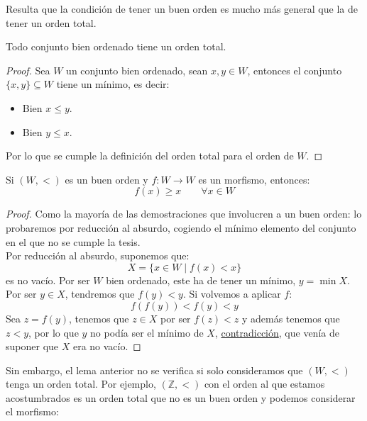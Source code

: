 \noindent
Resulta que la condición de tener un buen orden es mucho más general que la de tener un orden total.

\begin{prop}
    Todo conjunto bien ordenado tiene un orden total.
    \begin{proof}
        Sea $W$ un conjunto bien ordenado, sean $x,y\in W$, entonces el conjunto $\{x,y\} \subseteq W$ tiene un mínimo, es decir:
        \begin{itemize}
            \item Bien $x\leq y$.
            \item Bien $y\leq x$.
        \end{itemize}
        Por lo que se cumple la definición del orden total para el orden de $W$.
    \end{proof}
\end{prop}

\begin{lema}
    Si $(W,<)$ es un buen orden y $f:W\to W$ es un morfismo, entonces:
    \begin{equation*}
        f(x) \geq x \qquad \forall x\in W
    \end{equation*}
    \begin{proof}
        Como la mayoría de las demostraciones que involucren a un buen orden: lo probaremos por reducción al absurdo, cogiendo el mínimo elemento del conjunto en el que no se cumple la tesis.\\

        \noindent
        Por reducción al absurdo, suponemos que:
        \begin{equation*}
            X = \{x\in W \mid f(x) < x\}
        \end{equation*}
        es no vacío. Por ser $W$ bien ordenado, este ha de tener un mínimo, $y=\min X$. Por ser $y\in X$, tendremos que $f(y) < y$. Si volvemos a aplicar $f$:
        \begin{equation*}
            f(f(y)) < f(y) < y
        \end{equation*}
        Sea $z = f(y)$, tenemos que $z\in X$ por ser $f(z) < z$ y además tenemos que $z < y$, por lo que $y$ no podía ser el mínimo de $X$, \underline{contradicción}, que venía de suponer que $X$ era no vacío.
    \end{proof}
\end{lema}

\begin{ejemplo}
    Sin embargo, el lema anterior no se verifica si solo consideramos que $(W,<)$ tenga un orden total. Por ejemplo, $(\mathbb{Z},<)$ con el orden al que estamos acostumbrados es un orden total que no es un buen orden y podemos considerar el morfismo:
\end{ejemplo}

